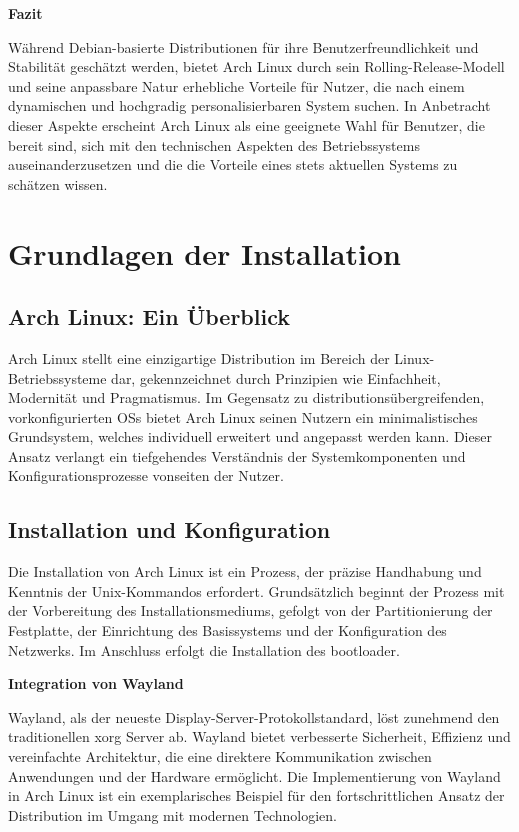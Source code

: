 \textbf{Fazit}

Während Debian-basierte Distributionen für ihre Benutzerfreundlichkeit und
Stabilität geschätzt werden, bietet Arch Linux durch sein Rolling-Release-Modell
und seine anpassbare Natur erhebliche Vorteile für Nutzer, die nach einem
dynamischen und hochgradig personalisierbaren System suchen. In Anbetracht
dieser Aspekte erscheint Arch Linux als eine geeignete Wahl für Benutzer, die
bereit sind, sich mit den technischen Aspekten des Betriebssystems
auseinanderzusetzen und die die Vorteile eines stets aktuellen Systems zu
schätzen wissen.

\newpage

\section{Grundlagen der Installation}
\subsection{Arch Linux: Ein Überblick}

Arch Linux stellt eine einzigartige Distribution im Bereich der
Linux-Betriebssysteme dar, gekennzeichnet durch Prinzipien wie Einfachheit,
Modernität und Pragmatismus. Im Gegensatz zu distributionsübergreifenden,
vorkonfigurierten \glspl{OS} bietet Arch Linux seinen Nutzern ein
minimalistisches Grundsystem, welches individuell erweitert und angepasst werden
kann. Dieser Ansatz verlangt ein tiefgehendes Verständnis der Systemkomponenten
und Konfigurationsprozesse vonseiten der Nutzer.

\subsection{Installation und Konfiguration}

Die Installation von Arch Linux ist ein Prozess, der präzise Handhabung und
Kenntnis der Unix-Kommandos erfordert. Grundsätzlich beginnt der Prozess mit der
Vorbereitung des Installationsmediums, gefolgt von der Partitionierung der
Festplatte, der Einrichtung des Basissystems und der Konfiguration des Netzwerks.
Im Anschluss erfolgt die Installation des \gls{bootloader}.

\textbf{Integration von Wayland}

Wayland, als der neueste Display-Server-Protokollstandard, löst zunehmend den
traditionellen \gls{xorg} Server ab. Wayland bietet verbesserte Sicherheit, Effizienz
und vereinfachte Architektur, die eine direktere Kommunikation zwischen
Anwendungen und der Hardware ermöglicht. Die Implementierung von Wayland in Arch
Linux ist ein exemplarisches Beispiel für den fortschrittlichen Ansatz der
Distribution im Umgang mit modernen Technologien.

